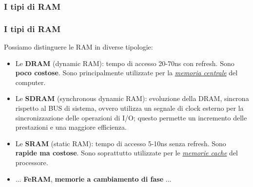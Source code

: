 \subsubsection[I tipi di RAM]{I tipi di RAM}
\begin{frame}
	\frametitle{I tipi di RAM}
	  
	\begin{block}{}
		
		Possiamo distinguere le RAM in diverse tipologie:
		\begin{itemize}
			\item Le \textbf{DRAM} (dynamic RAM): tempo di accesso 20-70ns con refresh. Sono \textbf{poco costose}. Sono principalmente utilizzate per la \textit{\underline{memoria centrale}} del computer.
			\item Le \textbf{SDRAM} (synchronous dynamic RAM): evoluzione della DRAM, sincrona rispetto al BUS di sistema, ovvero utilizza un segnale di clock esterno per la sincronizzazione delle operazioni di I/O; questo permette un incremento delle prestazioni e una maggiore efficienza.
			\item Le \textbf{SRAM} (static RAM): tempo di accesso 5-10ns senza refresh. Sono \textbf{rapide ma costose}. Sono soprattutto utilizzate per le \textit{\underline{memorie cache}} del processore.
			\item ... \textbf{FeRAM}, \textbf{memorie a cambiamento di fase} ...
		\end{itemize}
	\end{block}
\end{frame}


